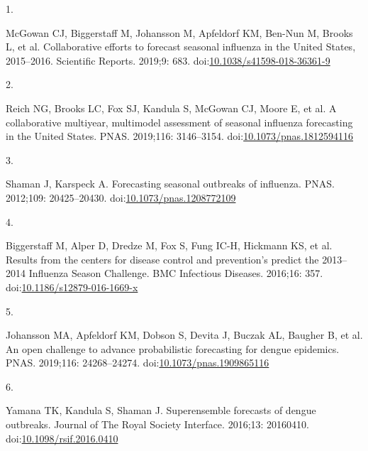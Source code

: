 \documentclass[10pt,letterpaper]{article}
\newlength{\cslhangindent}
\newlength{\csllabelwidth}
\newlength{\cslentryspacingunit} %
\newenvironment{CSLReferences}[2] %
 {%
  \setlength{\parindent}{0pt}
  \ifodd #1
  \let\oldpar\par
  \def\par{\hangindent=\cslhangindent\oldpar}
  \fi
  \setlength{\parskip}{#2\cslentryspacingunit}
 }%
 {}
\newcommand{\CSLLeftMargin}[1]{\parbox[t]{\csllabelwidth}{#1}}
\newcommand{\CSLRightInline}[1]{\parbox[t]{\linewidth - \csllabelwidth}{#1}\break}
\providecommand{\DIFdelend}{} %
\DeclareRobustCommand{\DIFdelend}{\DIFOaddend \let\includegraphics\DIFOincludegraphics} %
\begin{document}
\DIFdelend \hypertarget{refs}{}
\begin{CSLReferences}{0}{0}
\leavevmode{}%
\CSLLeftMargin{1. }%
\CSLRightInline{McGowan CJ, Biggerstaff M, Johansson M, Apfeldorf KM,
Ben-Nun M, Brooks L, et al. Collaborative efforts to forecast seasonal
influenza in the {United States}, 2015--2016. Scientific Reports.
2019;9: 683.
doi:\href{https://doi.org/10.1038/s41598-018-36361-9}{10.1038/s41598-018-36361-9}}

\leavevmode{}%
\CSLLeftMargin{2. }%
\CSLRightInline{Reich NG, Brooks LC, Fox SJ, Kandula S, McGowan CJ,
Moore E, et al. A collaborative multiyear, multimodel assessment of
seasonal influenza forecasting in the {United States}. PNAS. 2019;116:
3146--3154.
doi:\href{https://doi.org/10.1073/pnas.1812594116}{10.1073/pnas.1812594116}}

\leavevmode{}%
\CSLLeftMargin{3. }%
\CSLRightInline{Shaman J, Karspeck A. Forecasting seasonal outbreaks of
influenza. PNAS. 2012;109: 20425--20430.
doi:\href{https://doi.org/10.1073/pnas.1208772109}{10.1073/pnas.1208772109}}

\leavevmode{}%
\CSLLeftMargin{4. }%
\CSLRightInline{Biggerstaff M, Alper D, Dredze M, Fox S, Fung IC-H,
Hickmann KS, et al. Results from the centers for disease control and
prevention's predict the 2013--2014 {Influenza Season Challenge}. BMC
Infectious Diseases. 2016;16: 357.
doi:\href{https://doi.org/10.1186/s12879-016-1669-x}{10.1186/s12879-016-1669-x}}

\leavevmode{}%
\CSLLeftMargin{5. }%
\CSLRightInline{Johansson MA, Apfeldorf KM, Dobson S, Devita J, Buczak
AL, Baugher B, et al. An open challenge to advance probabilistic
forecasting for dengue epidemics. PNAS. 2019;116: 24268--24274.
doi:\href{https://doi.org/10.1073/pnas.1909865116}{10.1073/pnas.1909865116}}

\leavevmode{}%
\CSLLeftMargin{6. }%
\CSLRightInline{Yamana TK, Kandula S, Shaman J. Superensemble forecasts
of dengue outbreaks. Journal of The Royal Society Interface. 2016;13:
20160410.
doi:\href{https://doi.org/10.1098/rsif.2016.0410}{10.1098/rsif.2016.0410}}


\end{CSLReferences}
\end{document}
